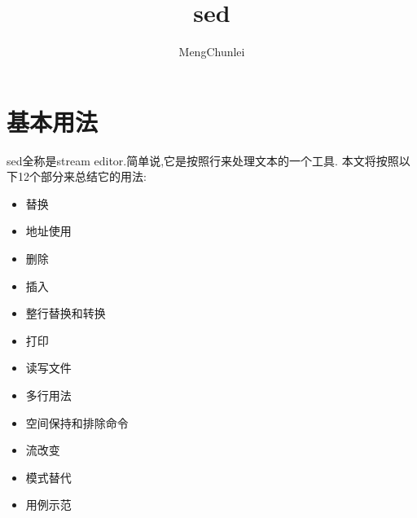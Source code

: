 \documentclass{article}
\title{sed}
\author{MengChunlei}
\begin{document}
\maketitle
\section{基本用法}
sed全称是stream editor.简单说,它是按照行来处理文本的一个工具. 本文将按照以下12个部分来总结它的用法: \par
\begin{itemize}
	\item 替换
	\item 地址使用
	\item 删除
	\item 插入
    \item 整行替换和转换
	\item 打印
	\item 读写文件
	\item 多行用法
	\item 空间保持和排除命令
	\item 流改变
	\item 模式替代
	\item 用例示范
\end{itemize}
\end{document}
